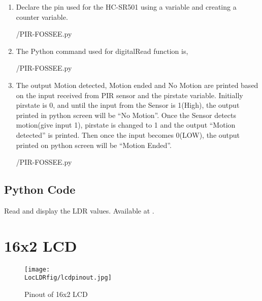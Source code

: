 \begin{enumerate}
  \item Declare the pin used for the HC-SR501 using a variable and creating a counter variable. 
        
        {\LocLDRpycode/PIR-FOSSEE.py} 
 \item The Python command used for digitalRead function is, 
        
        {\LocLDRpycode/PIR-FOSSEE.py} 
 \item The output Motion detected, Motion ended and No Motion are printed based on the input received      from PIR sensor and the pirstate variable. Initially pirstate is 0, and until the input from the Sensor is 1(High), the output printed in python screen will be “No Motion”. Once the Sensor detects motion(give input 1), pirstate is changed to 1 and the output “Motion detected” is printed. Then once the input becomes 0(LOW), the output printed on python screen will be “Motion Ended”.
        
        {\LocLDRpycode/PIR-FOSSEE.py} 

\end{enumerate}



\subsection{Python Code}
\label{sec:ldr-python-code}

\begin{pycode}
  {Read and display the LDR values.  Available at
    .}
  \label{py:ldr-read}
  
\end{pycode}



\section{16x2 LCD}
\begin{figure}[hpt]
  \centering
    \texttt{[image: \\LocLDRfig/lcdpinout.jpg]}
    \label{fig:pinlcd} \hfill
  \caption{Pinout of 16x2 LCD}
\end{figure} 

